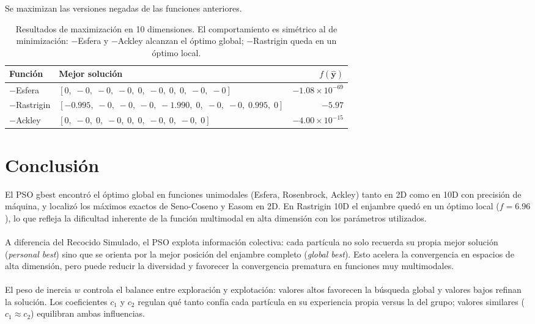 \documentclass[11pt]{article}
\begin{document}
Se maximizan las versiones negadas de las funciones anteriores.

\begin{table}[H]
\centering
\begin{tabular}{lp{8.5cm}r}
\hline\hline
Funci\'on & Mejor soluci\'on & $f(\hat{\mathbf{y}})$ \\
\hline
$-$Esfera    & $[0,\;-0,\;-0,\;-0,\;0,\;-0,\;0,\;0,\;-0,\;-0]$                             & $-1.08\times10^{-69}$ \\[3pt]
$-$Rastrigin & $[-0.995,\;-0,\;-0,\;-0,\;-1.990,\;0,\;-0,\;-0,\;0.995,\;0]$               & $-5.97$ \\[3pt]
$-$Ackley    & $[0,\;-0,\;0,\;-0,\;0,\;0,\;-0,\;0,\;-0,\;0]$                               & $-4.00\times10^{-15}$ \\
\hline\hline
\end{tabular}
\caption{Resultados de maximizaci\'on en 10 dimensiones. El comportamiento es sim\'etrico al de minimizaci\'on: $-$Esfera y $-$Ackley alcanzan el \'optimo global; $-$Rastrigin queda en un \'optimo local.}
\end{table}

\section{Conclusi\'on}

El PSO gbest encontr\'o el \'optimo global en funciones unimodales (Esfera, Rosenbrock, Ackley) tanto en 2D como en 10D con precisi\'on de m\'aquina, y localiz\'o los m\'aximos exactos de Seno-Coseno y Easom en 2D. En Rastrigin 10D el enjambre qued\'o en un \'optimo local ($f = 6.96$), lo que refleja la dificultad inherente de la funci\'on multimodal en alta dimensi\'on con los par\'ametros utilizados.\\\\
A diferencia del Recocido Simulado, el PSO explota informaci\'on colectiva: cada part\'icula no solo recuerda su propia mejor soluci\'on (\textit{personal best}) sino que se orienta por la mejor posici\'on del enjambre completo (\textit{global best}). Esto acelera la convergencia en espacios de alta dimensi\'on, pero puede reducir la diversidad y favorecer la convergencia prematura en funciones muy multimodales.\\\\
El peso de inercia $w$ controla el balance entre exploraci\'on y explotaci\'on: valores altos favorecen la b\'usqueda global y valores bajos refinan la soluci\'on. Los coeficientes $c_1$ y $c_2$ regulan qu\'e tanto conf\'ia cada part\'icula en su experiencia propia versus la del grupo; valores similares ($c_1 \approx c_2$) equilibran ambas influencias.
\end{document}
